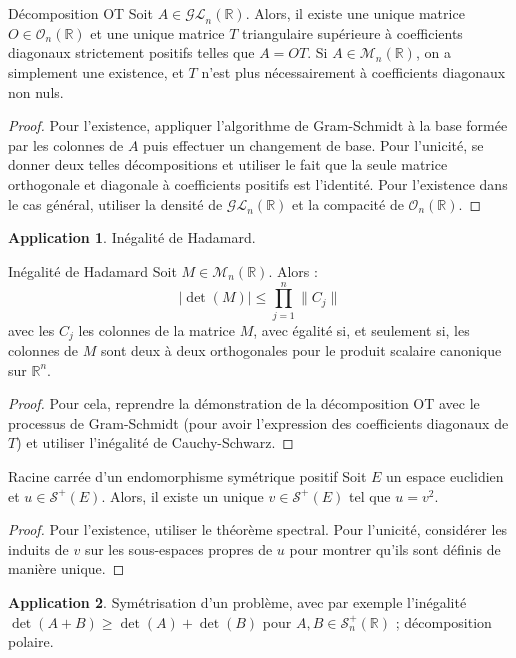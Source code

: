 \documentclass[french]{article}
\newcommand{\R}{\mathbb{R}}
\theoremstyle{theorem}
\theoremstyle{definition}
\newtheorem*{app}{Application}
\begin{document}
\begin{lem}{Décomposition OT}
	Soit $A\in\mathcal{GL}_n(\R)$. Alors, il existe une unique matrice $O\in\mathcal{O}_n(\R)$ et une unique matrice $T$ triangulaire supérieure à coefficients diagonaux strictement positifs telles que $A=OT$. Si $A\in\mathcal{M}_n(\R)$, on a simplement une existence, et $T$ n'est plus nécessairement à coefficients diagonaux non nuls.
\end{lem}
\begin{proof}
	Pour l'existence, appliquer l'algorithme de Gram-Schmidt à la base formée par les colonnes de $A$ puis effectuer un changement de base. Pour l'unicité, se donner deux telles décompositions et utiliser le fait que la seule matrice orthogonale et diagonale à coefficients positifs est l'identité. Pour l'existence dans le cas général, utiliser la densité de $\mathcal{GL}_n(\R)$ et la compacité de $\mathcal{O}_n(\R)$.
\end{proof}
\begin{app}
	Inégalité de Hadamard.
\end{app}

\begin{lem}{Inégalité de Hadamard}
	Soit $M\in\mathcal{M}_n(\R)$. Alors : $$\lvert\det(M)\rvert\leqslant\prod_{j=1}^{n}\lVert C_j\rVert$$ avec les $C_j$ les colonnes de la matrice $M$, avec égalité si, et seulement si, les colonnes de $M$ sont deux à deux orthogonales pour le produit scalaire canonique sur $\R^n$.
\end{lem}
\begin{proof}
	Pour cela, reprendre la démonstration de la décomposition OT avec le processus de Gram-Schmidt (pour avoir l'expression des coefficients diagonaux de $T$) et utiliser l'inégalité de Cauchy-Schwarz.
\end{proof}

\begin{lem}{Racine carrée d'un endomorphisme symétrique positif}
	Soit $E$ un espace euclidien et $u\in\mathcal{S}^+(E)$. Alors, il existe un unique $v\in\mathcal{S}^+(E)$ tel que $u=v^2$.
\end{lem}
\begin{proof}
	Pour l'existence, utiliser le théorème spectral. Pour l'unicité, considérer les induits de $v$ sur les sous-espaces propres de $u$ pour montrer qu'ils sont définis de manière unique.
\end{proof}
\begin{app}
	Symétrisation d'un problème, avec par exemple l'inégalité $\det(A+B)\geqslant\det(A)+\det(B)$ pour $A,B\in\mathcal{S}_n^+(\R)$ ; décomposition polaire.
\end{app}
\end{document}
